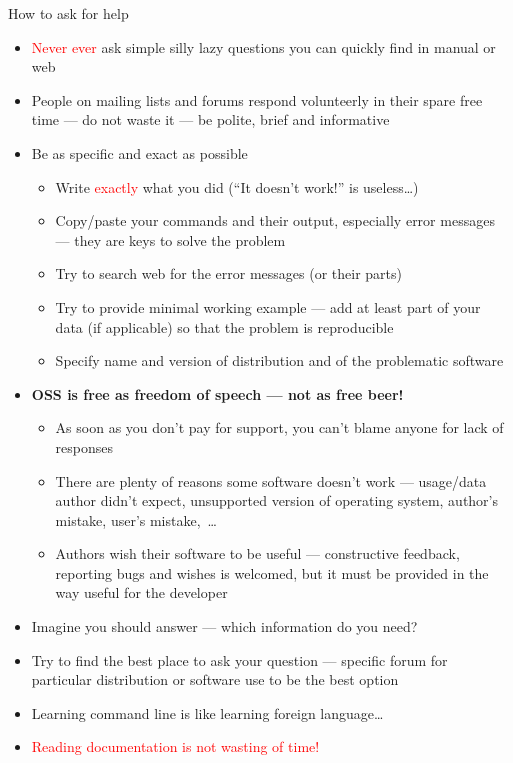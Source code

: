 \documentclass[compress, ucs, xelatex, 11pt, xcolor=svgnames,
  hyperref={
    bookmarks=true,
    unicode=true,
    colorlinks=true,
    pdftitle={Linux, command line and MetaCentrum},
    plainpages=false,
    pdfauthor={Vojtech Zeisek},
    pdfsubject={Course about use of Linux command line, writing shell scripts and using MetaCentrum of CESNET},
    pdfcreator={XeLaTeX},
    pdfkeywords={Linux, GNU, BASH, shell, command line, MetaCentrum},
    linkcolor=DarkRed,
    anchorcolor=DarkBlue,
    citecolor=Indigo,
    filecolor=NavyBlue,
    menucolor=DarkMagenta,
    urlcolor=DarkBlue,
    pdftex},
  url={hyphens, lowtilde} %
  ]{beamer}
\renewcommand{\alert}[1]{\textcolor{red}{#1}}
\begin{document}
\begin{frame}[allowframebreaks]{How to ask for help}
  \label{howtoask}
  \begin{itemize}
    \item \alert{Never ever} ask simple silly lazy questions you can quickly find in manual or web
    \item People on mailing lists and forums respond volunteerly in their spare free time --- do not waste it --- be polite, brief and informative
    \item Be as specific and exact as possible
    \begin{itemize}
      \item Write \alert{exactly} what you did (``It doesn't work!'' is useless\ldots)
      \item Copy/paste your commands and their output, especially error messages --- they are keys to solve the problem
      \item Try to search web for the error messages (or their parts)
      \item Try to provide minimal working example --- add at least part of your data (if applicable) so that the problem is reproducible
      \item Specify name and version of distribution and of the problematic software
    \end{itemize}
    \item \textbf{OSS is free as freedom of speech --- not as free beer!}
    \begin{itemize}
      \item As soon as you don't pay for support, you can't blame anyone for lack of responses
      \item There are plenty of reasons some software doesn't work --- usage/data author didn't expect, unsupported version of operating system, author's mistake, user's mistake,~\ldots
      \item Authors wish their software to be useful --- constructive feedback, reporting bugs and wishes is welcomed, but it must be provided in the way useful for the developer
    \end{itemize}
    \item Imagine you should answer --- which information do you need?
    \item Try to find the best place to ask your question --- specific forum for particular distribution or software use to be the best option
    \item Learning command line is like learning foreign language\ldots
    \item \alert{Reading documentation is not wasting of time!}
  \end{itemize}
\end{frame}
\end{document}

